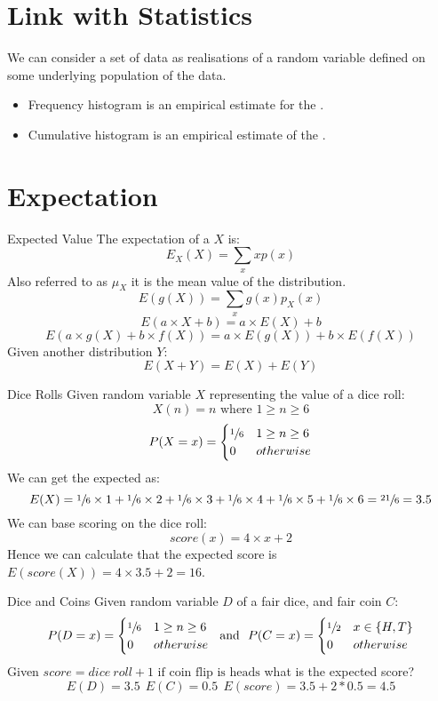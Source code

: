 \section{Link with Statistics}
We can consider a set of data as realisations of a random variable defined on some underlying population of the data.
\begin{itemize}
	\item Frequency histogram is an empirical estimate for the .
	\item Cumulative histogram is an empirical estimate of the .
\end{itemize}

\section{Expectation}
\begin{definitionbox}{Expected Value}
	The expectation of a  $X$ is:
	\[E_X(X) = \sum_{x}xp(x)\]
	Also referred to as $\mu_X$ it is the mean value of the distribution.
	\[E(g(X)) = \sum_xg(x)p_X(x)\]
	\[E(a \times X + b) = a \times E(X) + b\]
	\[E(a \times g(X) + b \times f(X)) = a \times E(g(X)) + b \times E(f(X))\]
	Given another distribution $Y$:
	\[E(X + Y) = E(X) + E(Y)\]
\end{definitionbox}
\begin{examplebox}{Dice Rolls}
	Given random variable $X$ representing the value of a dice roll:
	\[X(n) = n \text{ where } 1 \geq n \geq 6\]
	\[P(X = x) = \begin{cases}
			\sfrac{1}{6} & 1 \geq n \geq 6 \\
			0            & otherwise       \\
		\end{cases}\]
	We can get the expected as:
	\[E(X) = \sfrac{1}{6} \times 1 + \sfrac{1}{6} \times 2 + \sfrac{1}{6} \times 3 + \sfrac{1}{6} \times 4 + \sfrac{1}{6} \times 5 + \sfrac{1}{6} \times 6 = \sfrac{21}{6} = 3.5\]
	We can base scoring on the dice roll:
	\[score(x) = 4 \times x + 2\]
	Hence we can calculate that the expected score is $E(score(X)) = 4 \times 3.5 + 2 = 16$.
\end{examplebox}

\begin{examplebox}{Dice and Coins}
	Given random variable $D$ of a fair dice, and fair coin $C$:
	\[P(D = x) = \begin{cases}
			\sfrac{1}{6} & 1 \geq n \geq 6 \\
			0            & otherwise       \\
		\end{cases} \ \text{ and } \ P(C = x) = \begin{cases}
			\sfrac{1}{2} & x \in \{H,T\} \\
			0            & otherwise     \\
		\end{cases}\]
	Given $score = dice \ roll + 1 \text{ if coin flip is heads}$ what is the expected score?
	\[E(D) = 3.5 \ \ E(C) = 0.5 \ \ E(score) = 3.5 + 2 * 0.5 = 4.5\]
\end{examplebox}

